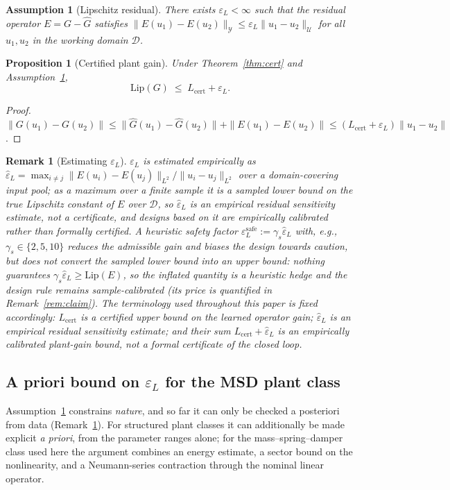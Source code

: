 \documentclass[11pt,sagev,times]{sagej}
\newtheorem{proposition}{Proposition}
\newtheorem{assumption}{Assumption}
\newtheorem{remark}{Remark}
\newcommand{\Ltwo}{L^2}
\newcommand{\Ghat}{\hat{G}}
\newcommand{\Lhat}{L_{\mathrm{cert}}}
\newcommand{\epsL}{\varepsilon_L}
\begin{document}
\begin{assumption}[Lipschitz residual]\label{ass:residual}
There exists $\epsL<\infty$ such that the residual operator
$E=G-\Ghat$ satisfies
$\|E(u_1)-E(u_2)\|_{\mathcal{Y}}\le\epsL\|u_1-u_2\|_{\mathcal{U}}$
for all $u_1,u_2$ in the working domain $\mathcal{D}$.
\end{assumption}

\begin{proposition}[Certified plant gain]\label{prop:gain}
Under Theorem~\ref{thm:cert} and Assumption~\ref{ass:residual},
\begin{equation}
  \mathrm{Lip}(G)\;\le\;\Lhat+\epsL .
\end{equation}
\end{proposition}
\begin{proof}
$\|G(u_1)-G(u_2)\|
\le\|\Ghat(u_1)-\Ghat(u_2)\|+\|E(u_1)-E(u_2)\|
\le(\Lhat+\epsL)\|u_1-u_2\|$.
\end{proof}

\begin{remark}[Estimating $\epsL$]\label{rem:epsL}
$\epsL$ is estimated empirically as
$\hat\epsL=\max_{i\ne j}\|E(u_i)-E(u_j)\|_{\Ltwo}/\|u_i-u_j\|_{\Ltwo}$ over a
domain-covering input pool; as a maximum over a finite sample it is a
\emph{sampled lower bound} on the true Lipschitz constant of $E$ over
$\mathcal{D}$, so $\hat\epsL$ is an \emph{empirical residual sensitivity
estimate}, not a certificate, and designs based on it are \emph{empirically
calibrated} rather than formally certified. A heuristic safety factor
$\epsL^{\mathrm{safe}}:=\gamma_s\hat\epsL$ with, e.g.,
$\gamma_s\in\{2,5,10\}$ reduces the admissible gain and biases the design
towards caution, but does \emph{not} convert the sampled lower bound into an
upper bound: nothing guarantees $\gamma_s\hat\epsL\ge\mathrm{Lip}(E)$, so
the inflated quantity is a heuristic hedge and the design rule remains
\emph{sample-calibrated} (its price is quantified in
Remark~\ref{rem:claim}).
The terminology used throughout this paper is fixed accordingly:
$\Lhat$ is a \emph{certified upper bound on the learned operator gain};
$\hat\epsL$ is an \emph{empirical residual sensitivity estimate}; and their
sum $\Lhat+\hat\epsL$ is an \emph{empirically calibrated plant-gain
bound}, not a formal certificate of the closed loop.
\end{remark}

\subsection{A priori bound on $\epsL$ for the MSD plant class}
\label{sec:apriori}
Assumption~\ref{ass:residual} constrains \emph{nature}, and so far it can
only be checked a posteriori from data (Remark~\ref{rem:epsL}). For
structured plant classes it can additionally be made explicit \emph{a
priori}, from the parameter ranges alone; for the mass--spring--damper class
used here the argument combines an energy estimate, a sector bound on the
nonlinearity, and a Neumann-series contraction through the nominal linear
operator.
\end{document}
